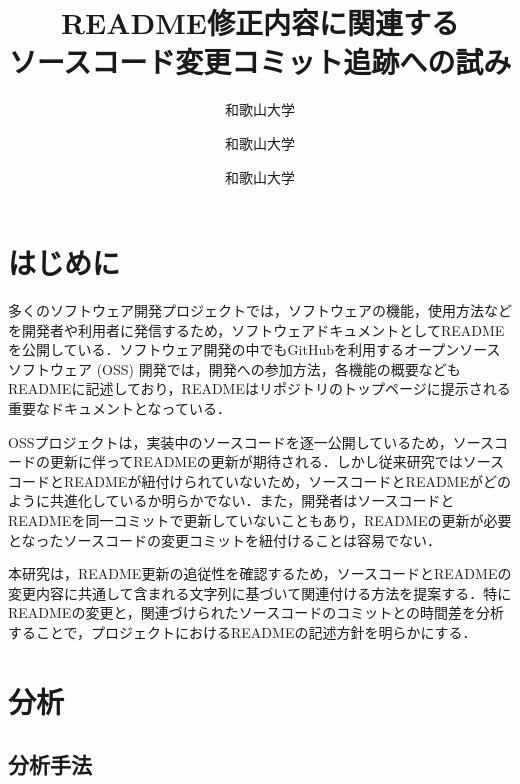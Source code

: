 \documentclass[uplatex,dvipdfmx,a4paper,twocolumn,base=11pt,jbase=11pt,ja=standard]{bxjsarticle}  %
\title{README修正内容に関連する\\ソースコード変更コミット追跡への試み}{Toward tracking source code change commits related to README revision}
\author{和歌山大学}{白﨑 優奈}{Shirasaki Yuna, Wakayama University}
\author{和歌山大学}{伊原 彰紀}{Akinori Ihara, Wakayama University}
\author{和歌山大学}{石岡 直樹}{Naoki Ishioka, Wakayama University}
\newcommand{\todo}[1]{\colorbox{yellow}{{\bf TODO}:}{\color{red} {\textbf{[#1]}}}}
\begin{document}
\maketitle


\section{はじめに}


多くのソフトウェア開発プロジェクトでは，ソフトウェアの機能，使用方法などを開発者や利用者に発信するため，ソフトウェアドキュメントとしてREADMEを公開している．ソフトウェア開発の中でもGitHubを利用するオープンソースソフトウェア (OSS) 開発では，開発への参加方法，各機能の概要などもREADMEに記述しており，READMEはリポジトリのトップページに提示される重要なドキュメントとなっている．

OSSプロジェクトは，実装中のソースコードを逐一公開しているため，ソースコードの更新に伴ってREADMEの更新が期待される．しかし従来研究ではソースコードとREADMEが紐付けられていないため，ソースコードとREADMEがどのように共進化しているか明らかでない．また，開発者はソースコードとREADMEを同一コミットで更新していないこともあり，READMEの更新が必要となったソースコードの変更コミットを紐付けることは容易でない．

本研究は，README更新の追従性を確認するため，ソースコードとREADMEの変更内容に共通して含まれる文字列に基づいて関連付ける方法を提案する．特にREADMEの変更と，関連づけられたソースコードのコミットとの時間差を分析することで，プロジェクトにおけるREADMEの記述方針を明らかにする．


\section{分析}

\subsection{分析手法}

\end{document}
